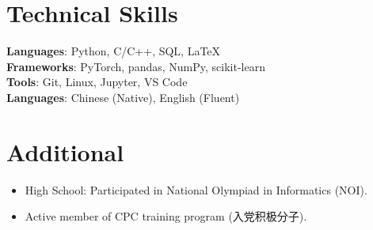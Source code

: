 \documentclass[letterpaper,11pt]{article}
\newcommand{\resumeItem}[1]{
  \item\small{
    {#1 \vspace{-2pt}}
  }
}
\newcommand{\resumeSubItem}[1]{\resumeItem{#1}\vspace{-4pt}}
\newcommand{\resumeSubHeadingListStart}{\begin{itemize}[leftmargin=0.15in, label={}]}
\newcommand{\resumeSubHeadingListEnd}{\end{itemize}}
\begin{document}
\section{Technical Skills}
 \begin{itemize}[leftmargin=0.15in, label={}]
    \small{\item{
     \textbf{Languages}{: Python, C/C++, SQL, LaTeX} \\
     \textbf{Frameworks}{: PyTorch, pandas, NumPy, scikit-learn} \\
     \textbf{Tools}{: Git, Linux, Jupyter, VS Code} \\
     \textbf{Languages}{: Chinese (Native), English (Fluent)}
    }}
 \end{itemize}

\section{Additional}
  \resumeSubHeadingListStart
    \resumeSubItem{High School: Participated in National Olympiad in Informatics (NOI).}
    \resumeSubItem{Active member of CPC training program (入党积极分子).}
  \resumeSubHeadingListEnd
\end{document}
